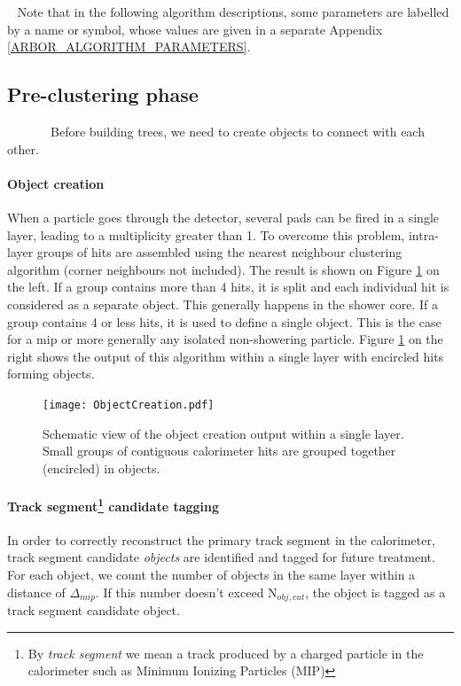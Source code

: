 \documentclass[12pt]{article}
\begin{document}
~\newline 
Note that in the following algorithm descriptions, some parameters are labelled by a name or symbol, whose values are given in a separate Appendix \ref{ARBOR_ALGORITHM_PARAMETERS}.

\newpage
\subsection{Pre-clustering phase} 

~~~~~~~Before building trees, we need to create objects to connect with each other.

\paragraph*{Object creation} When a particle goes through the detector, several pads can be fired in a single layer, leading to a multiplicity greater than 1. To overcome this problem, intra-layer groups of hits are assembled using the nearest neighbour clustering algorithm (corner neighbours not included). The result is shown on Figure \ref{ARBOR_OBJECT_CREATION} on the left. If a group contains more than 4 hits, it is split and each individual hit is considered as a separate object. This generally happens in the shower core. If a group contains 4 or less hits, it is used to define a single object. This is the case for a mip or more generally any isolated non-showering particle. Figure \ref{ARBOR_OBJECT_CREATION} on the right shows the output of this algorithm within a single layer with encircled hits forming objects.

\begin{figure}[!h]
  \begin{center}
    \texttt{[image: ObjectCreation.pdf]}
  \end{center}
  \caption{\label{ARBOR_OBJECT_CREATION} Schematic view of the object creation output within a single layer. Small groups of contiguous calorimeter hits are grouped together (encircled) in objects.}
\end{figure}

\paragraph*{Track segment\footnote{By \textit{track segment} we mean a track produced by a charged particle in the calorimeter such as Minimum Ionizing Particles (MIP)} candidate tagging}
In order to correctly reconstruct the primary track segment in the calorimeter, track segment candidate \textit{objects} are identified and tagged for future treatment. For each object, we count the number of objects in the same layer within a distance of $\Delta_{mip}$. If this number doesn't exceed N$_{obj,cut}$, the object is tagged as a track segment candidate object.
\end{document}
